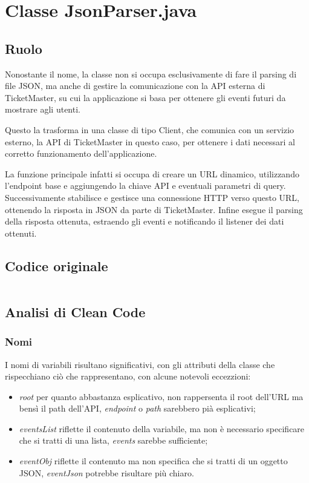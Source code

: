\section{Classe JsonParser.java}
    \subsection{Ruolo}
    Nonostante il nome, la classe non si occupa esclusivamente di fare il parsing di file JSON, ma anche di gestire la comunicazione con la API esterna di TicketMaster, su cui la applicazione 
    si basa per ottenere gli eventi futuri da mostrare agli utenti.
    
    Questo la trasforma in una classe di tipo Client, che comunica con un servizio esterno, la API di TicketMaster in questo caso, per ottenere i dati necessari al corretto funzionamento dell'applicazione.

    La funzione principale infatti si occupa di creare un URL dinamico, utilizzando l'endpoint base e aggiungendo la chiave API e eventuali parametri di query.
    Successivamente stabilisce e gestisce una connessione HTTP verso questo URL, ottenendo la risposta in JSON da parte di TicketMaster.
    Infine esegue il parsing della risposta ottenuta, estraendo gli eventi e notificando il listener dei dati ottenuti.

    \subsection{Codice originale}
    \inputminted[linenos, frame=lines]{java}{../old/JsonParser.java}

    \subsection{Analisi di Clean Code}
        \subsubsection{Nomi}
        I nomi di variabili risultano significativi, con gli attributi della classe che rispecchiano ciò che rappresentano, con alcune notevoli eccezzioni:
        \begin{itemize}
            \item \textit{root} per quanto abbastanza esplicativo, non rappersenta il root dell'URL ma bensì il path dell'API, \textit{endpoint} o \textit{path} sarebbero pià esplicativi;
            \item \textit{eventsList} riflette il contenuto della variabile, ma non è necessario specificare che si tratti di una lista, \textit{events} sarebbe sufficiente;
            \item \textit{eventObj} riflette il contenuto ma non specifica che si tratti di un oggetto JSON, \textit{eventJson} potrebbe risultare più chiaro.
        \end{itemize}

